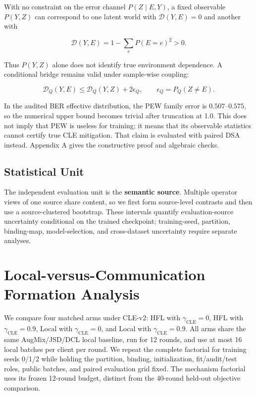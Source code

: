 With no constraint on the error channel \(P(Z\mid E,Y)\), a fixed observable \(P(Y,Z)\) can correspond to one latent world with \(\mathcal D(Y,E)=0\) and another with

\[
\mathcal D(Y,E)=1-\sum_eP(E=e)^2>0.
\]

Thus \(P(Y,Z)\) alone does not identify true environment dependence. A conditional bridge remains valid under sample-wise coupling:

\[
\mathcal D_Q(Y,E)\le
\mathcal D_Q(Y,Z)+2\epsilon_Q,
\qquad
\epsilon_Q=P_Q(Z\neq E).
\]

In the audited BER effective distribution, the PEW family error is \(0.507\)--\(0.575\), so the numerical upper bound becomes trivial after truncation at 1.0. This does not imply that PEW is useless for training; it means that its observable statistics cannot certify true CLE mitigation. That claim is evaluated with paired DSA instead. Appendix A gives the constructive proof and algebraic checks.

\subsection{Statistical Unit}

The independent evaluation unit is the \textbf{semantic source}. Multiple operator views of one source share content, so we first form source-level contrasts and then use a source-clustered bootstrap. These intervals quantify evaluation-source uncertainty conditional on the trained checkpoint; training-seed, partition, binding-map, model-selection, and cross-dataset uncertainty require separate analyses.

\section{Local-versus-Communication Formation Analysis}

We compare four matched arms under CLE-v2: HFL with \(\gamma_{\mathrm{CLE}}=0\), HFL with \(\gamma_{\mathrm{CLE}}=0.9\), Local with \(\gamma_{\mathrm{CLE}}=0\), and Local with \(\gamma_{\mathrm{CLE}}=0.9\). All arms share the same AugMix/JSD/DCL local baseline, run for 12 rounds, and use at most 16 local batches per client per round. We repeat the complete factorial for training seeds 0/1/2 while holding the partition, binding, initialization, fit/audit/test roles, public batches, and paired evaluation grid fixed. The mechanism factorial uses its frozen 12-round budget, distinct from the 40-round held-out objective comparison.

